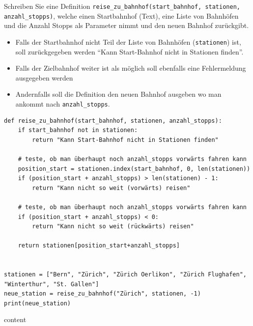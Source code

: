 \begin{questions}
Schreiben Sie eine Definition \lstinline|reise_zu_bahnhof(start_bahnhof, stationen, anzahl_stopps)|, welche einen Startbahnhof (Text), eine Liste von Bahnhöfen und die Anzahl Stopps als Parameter nimmt und den neuen Bahnhof zurückgibt.
\begin{itemize}
\item Falls der Startbahnhof nicht Teil der Liste von Bahnhöfen (\lstinline|stationen|) ist, soll zurückgegeben werden ``Kann Start-Bahnhof nicht in Stationen finden''.
\item Falls der Zielbahnhof weiter ist als möglich soll ebenfalls eine Fehlermeldung ausgegeben werden
\item Andernfalls soll die Definition den neuen Bahnhof ausgeben wo man ankommt nach \lstinline|anzahl_stopps|.
\end{itemize}
\begin{solution}
\begin{lstlisting}
def reise_zu_bahnhof(start_bahnhof, stationen, anzahl_stopps):
    if start_bahnhof not in stationen:
        return "Kann Start-Bahnhof nicht in Stationen finden"
    
    # teste, ob man überhaupt noch anzahl_stopps vorwärts fahren kann
    position_start = stationen.index(start_bahnhof, 0, len(stationen))
    if (position_start + anzahl_stopps) > len(stationen) - 1:
        return "Kann nicht so weit (vorwärts) reisen"

    # teste, ob man überhaupt noch anzahl_stopps vorwärts fahren kann
    if (position_start + anzahl_stopps) < 0:
        return "Kann nicht so weit (rückwärts) reisen"

    return stationen[position_start+anzahl_stopps]


stationen = ["Bern", "Zürich", "Zürich Oerlikon", "Zürich Flughafen", "Winterthur", "St. Gallen"]
neue_station = reise_zu_bahnhof("Zürich", stationen, -1)
print(neue_station)
\end{lstlisting}
content
\end{solution}

\end{questions}
